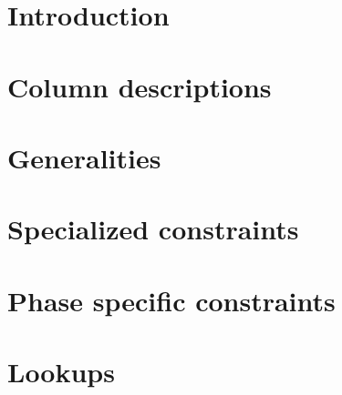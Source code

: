 

\section{Introduction}                   \label{rlptxn: intro}                           
\section{Column descriptions}            \label{rlptxn: column descriptions}             
\section{Generalities}                   \label{rlptxn: generalities}                    
\section{Specialized constraints}        \label{rlptxn: specialized}                     
\section{Phase specific constraints}     \label{rlptxn: phase specific constraints}      
\section{Lookups}                        \label{rlptxn: lookups}                         
